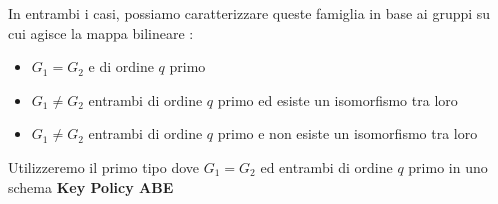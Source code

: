 In entrambi i casi, possiamo caratterizzare\cite{maya3} queste famiglia in base ai gruppi su cui agisce la mappa bilineare :
\begin{itemize}
	\item $G_1 = G_2$ e di ordine $q$ primo
	\item $G_1 \neq G_2$ entrambi di ordine $q$ primo ed esiste un isomorfismo tra loro
	\item $G_1 \neq G_2$ entrambi di ordine $q$ primo e non esiste un isomorfismo tra loro
\end{itemize}	

Utilizzeremo il primo tipo dove $G_1 = G_2$ ed entrambi di ordine $q$ primo in uno schema \textbf{Key Policy ABE}

\newpage

\newpage

\newpage


